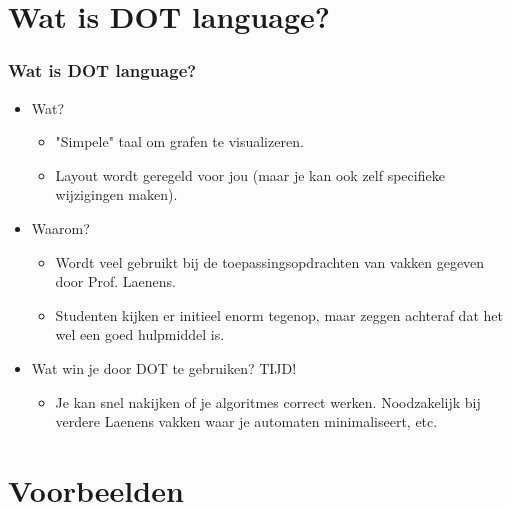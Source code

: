 

\section{Wat is DOT language?}
\begin{frame}
	\frametitle{Wat is DOT language?}
    \begin{itemize}
    \item Wat?
        \begin{itemize}
          \item "Simpele" taal om grafen te visualizeren.
          \item Layout wordt geregeld voor jou (maar je kan ook zelf specifieke wijzigingen maken).
    	\end{itemize}
    \item Waarom?
        \begin{itemize}
          \item Wordt veel gebruikt bij de toepassingsopdrachten van vakken gegeven door Prof. Laenens.
          \item Studenten kijken er initieel enorm tegenop, maar zeggen achteraf dat het wel een goed hulpmiddel is.
    	\end{itemize}
    \item Wat win je door DOT te gebruiken? TIJD!
    	\begin{itemize}
          \item Je kan snel nakijken of je algoritmes correct werken. Noodzakelijk bij verdere Laenens vakken waar je automaten minimaliseert, etc.
    	\end{itemize}
    \end{itemize}
\end{frame}

\section{Voorbeelden}




